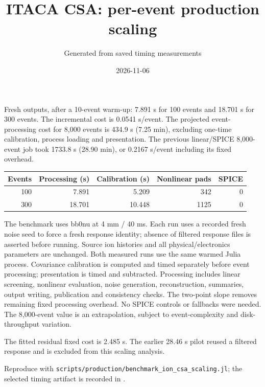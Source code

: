 \documentclass[11pt]{article}
\title{ITACA CSA: per-event production scaling}
\author{Generated from saved timing measurements}\date{2026-11-06}
\begin{document}
\maketitle
Fresh outputs, after a 10-event warm-up: 7.891 s for 100 events and 18.701 s for 300 events. The incremental cost is 0.0541 s/event. The projected event-processing cost for 8,000 events is 434.9 s (7.25 min), excluding one-time calibration, process loading and presentation. The previous linear/SPICE 8,000-event job took 1733.8 s (28.90 min), or 0.2167 s/event including its fixed overhead.
\begin{center}\begin{tabular}{rrrrr}\toprule
Events & Processing (s) & Calibration (s) & Nonlinear pads & SPICE\\\midrule
100 & 7.891 & 5.209 & 342 & 0 \\
300 & 18.701 & 10.448 & 1125 & 0 \\
\bottomrule\end{tabular}\end{center}
The benchmark uses bb0nu at 4 mm / 40 ms. Each run uses a recorded fresh noise seed to force a fresh response identity; absence of filtered response files is asserted before running. Source ion histories and all physical/electronics parameters are unchanged. Both measured runs use the same warmed Julia process. Covariance calibration is computed and timed separately before event processing; presentation is timed and subtracted. Processing includes linear screening, nonlinear evaluation, noise generation, reconstruction, summaries, output writing, publication and consistency checks. The two-point slope removes remaining fixed processing overhead. No SPICE controls or fallbacks were needed. The 8,000-event value is an extrapolation, subject to event-complexity and disk-throughput variation.

The fitted residual fixed cost is 2.485 s. The earlier 28.46 s pilot reused a filtered response and is excluded from this scaling analysis.

Reproduce with \texttt{scripts/production/benchmark\_ion\_csa\_scaling.jl}; the selected timing artifact is recorded in .
\end{document}
